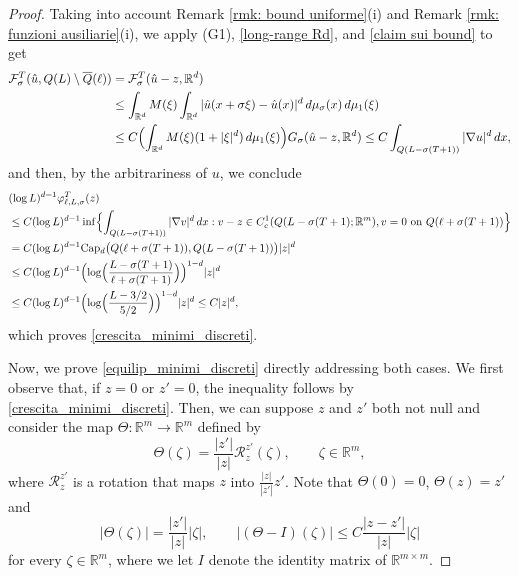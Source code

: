 \documentclass{article}
\theoremstyle{plain}
\theoremstyle{definition}
\def\rr{{\mathbb R}}
\def\ms{\mu_\sigma}
\newcommand{\f}{\varphi}
\newcommand{\s}{\sigma}
\numberwithin{equation}{section}
\begin{document}
\begin{proof}
Taking into account Remark \ref{rmk: bound uniforme}(i) and Remark \ref{rmk: funzioni ausiliarie}(i), we apply (G1), \eqref{long-range Rd}, and \eqref{claim sui bound} to get 
    \begin{align*}
    \mathcal{F}^T_\sigma(\hat{u},Q(L)\setminus\overline{Q}(\ell))
    & = \mathcal{F}^T_\sigma(\hat{u}-z,\rr^d) \\
    & \leq \int_{\rr^d}M(\xi)\int_{\rr^d}|\hat{u}(x+\s\xi)-\hat{u}(x)|^d\,d\ms(x)\,d\mu_1(\xi) \\
    & \leq C\Bigl(\int_{\rr^d}M(\xi)(1+|\xi|^d)\,d\mu_1(\xi)\Bigr) G_\s(\hat{u}-z,\rr^d) \leq C\int_{Q(L-\s(T+1))}|\nabla u|^d\, dx,
    \end{align*}
    and then, by the arbitrariness of $u$, we conclude
\begin{align*} \notag
    &(\log L)^{d-1}\f^T_{\ell,L,\sigma}(z) \\ \notag
    & \leq C(\log L)^{d-1}\inf\Bigl\{\int_{Q(L-\sigma (T+1))}|\nabla v|^d\, dx: v-z\in C^1_c(Q(L-\sigma (T+1);\mathbb{R}^m),  v=0  \text{ on } Q(\ell+\sigma (T+1))\Bigr\}\\ \notag
    &=C (\log L)^{d-1} {\rm Cap}\displaystyle_{d}\bigl(Q(\ell+\sigma (T+1)),Q(L-\sigma(T+1))\bigr)|z|^d\\
\notag     &\leq C(\log L)^{d-1}\Bigl(\log\Bigl(\frac{L-\sigma (T+1)}{\ell+\sigma(T+1)}\Bigr)\Bigr)^{1-d}|z|^d\\ 
    &\leq C(\log L)^{d-1}\Bigl(\log\Bigl(\frac{L-3/2}{5/2}\Bigr)\Bigr)^{1-d}|z|^d \leq  C|z|^d,
\end{align*}
which proves \eqref{crescita_minimi_discreti}.
    
Now, we prove \eqref{equilip_minimi_discreti} directly addressing both cases. We first observe that, if $z=0$ or $z'=0$, the inequality follows  by \eqref{crescita_minimi_discreti}. Then, we can suppose $z$ and $z'$ both not null and consider the map $\Theta: \mathbb{R}^{m}\rightarrow \mathbb{R}^{m}$ defined by
        \begin{equation*}
            \Theta(\zeta)=\frac{|z'|}{|z|}\mathcal{R}^{z'}_{z}(\zeta), \qquad \zeta\in \rr^m,
        \end{equation*}
        where $\mathcal{R}^{z'}_{z}$ is a rotation that maps $z$ into $\frac{|z|}{|z'|}z'$. Note that $\Theta(0)=0$, $\Theta(z)=z'$ and 
        \begin{equation}
            |\Theta(\zeta)|= \frac{|z'|}{|z|}|\zeta|, \qquad | (\Theta-I)(\zeta)|\leq C \frac{|z-z'|}{|z|}|\zeta|
            \label{31}
        \end{equation}
        for every $\zeta\in\rr^m$, where we let $I$ denote the identity matrix of $\rr^{m\times m}$. 
        

\end{proof}
\end{document}
